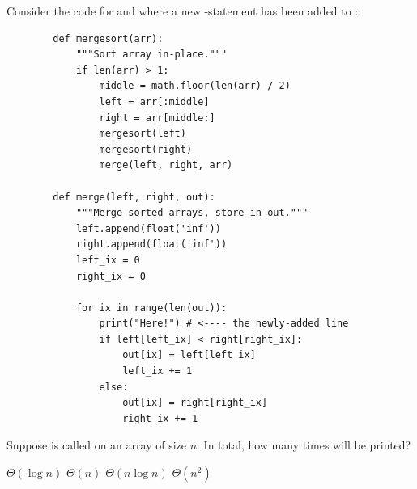 \begin{prob}

    Consider the code for  and  where a new
    -statement has been added to :

    \begin{verbatim}
        def mergesort(arr):
            """Sort array in-place."""
            if len(arr) > 1:
                middle = math.floor(len(arr) / 2)
                left = arr[:middle]
                right = arr[middle:]
                mergesort(left)
                mergesort(right)
                merge(left, right, arr)

        def merge(left, right, out):
            """Merge sorted arrays, store in out."""
            left.append(float('inf'))
            right.append(float('inf'))
            left_ix = 0
            right_ix = 0

            for ix in range(len(out)):
                print("Here!") # <---- the newly-added line
                if left[left_ix] < right[right_ix]:
                    out[ix] = left[left_ix]
                    left_ix += 1
                else:
                    out[ix] = right[right_ix]
                    right_ix += 1
    \end{verbatim}

    Suppose  is called on an array of size $n$. In total, how
    many times will  be printed?

    \begin{choices}
        \choice $\Theta(\log n)$
        \choice $\Theta(n)$
        \correctchoice $\Theta(n \log n)$
        \choice $\Theta(n^2)$
    \end{choices}

\end{prob}
